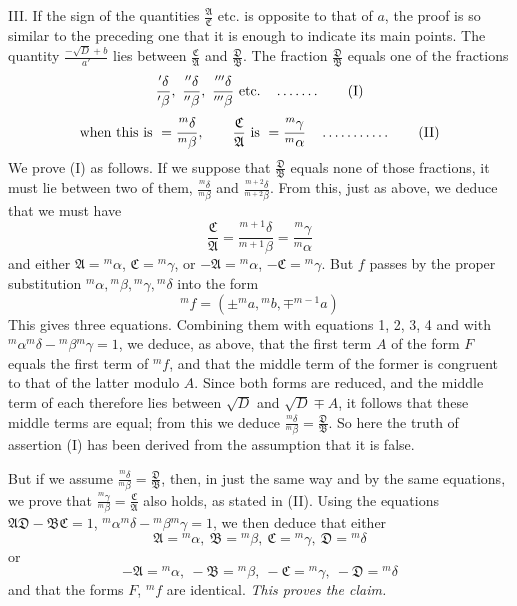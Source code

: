 III. If the sign of the quantities $\frac{\mathfrak{A}}{\mathfrak{C}}$ etc. is opposite to that of $a$, the proof is so similar to the preceding one that it is enough to indicate its main points. The quantity $\frac{-\surd D+b}{a'}$ lies between $\frac{\mathfrak{C}}{\mathfrak{A}}$ and $\frac{\mathfrak{D}}{\mathfrak{B}}$. The fraction $\frac{\mathfrak{D}}{\mathfrak{B}}$ equals one of the fractions
\begin{equation*}
\frac{{}'\delta}{{}'\beta},\ \frac{{}''\delta}{{}''\beta},\ \frac{{}'''\delta}{{}'''\beta}\text{ etc.}
\quad \mathinner{\ldotp\ldotp\ldotp\ldotp\ldotp\ldotp\ldotp} \tag*{(I)}
\end{equation*}
\begin{equation*}
\text{when this is }=\frac{{}^m\delta}{{}^m\beta},\qquad \frac{\mathfrak{C}}{\mathfrak{A}}\text{ is }=\frac{{}^m\gamma}{{}^m\alpha}
\quad \mathinner{\ldotp\ldotp\ldotp\ldotp\ldotp\ldotp\ldotp\ldotp\ldotp\ldotp\ldotp} \tag*{(II)}
\end{equation*}
We prove (I) as follows. If we suppose that $\frac{\mathfrak{D}}{\mathfrak{B}}$ equals none of those fractions, it must lie between two of them, $\frac{{}^m\delta}{{}^m\beta}$ and $\frac{{}^{m+2}\delta}{{}^{m+2}\beta}$. From this, just as above, we deduce that we must have
\[
\frac{\mathfrak{C}}{\mathfrak{A}}=\frac{{}^{m+1}\delta}{{}^{m+1}\beta}=\frac{{}^m\gamma}{{}^m\alpha}
\]
and either $\mathfrak{A}={}^m\alpha$, $\mathfrak{C}={}^m\gamma$, or $-\mathfrak{A}={}^m\alpha$, $-\mathfrak{C}={}^m\gamma$. But $f$ passes by the proper substitution ${}^m\alpha,{}^m\beta,{}^m\gamma,{}^m\delta$ into the form
\[
{}^m f=(\pm{}^m a,{}^m b,\mp{}^{m-1}a)
\]
This gives three equations. Combining them with equations 1, 2, 3, 4 and with ${}^m\alpha{}^m\delta-{}^m\beta{}^m\gamma=1$, we deduce, as above, that the first term $A$ of the form $F$ equals the first term of ${}^m f$, and that the middle term of the former is congruent to that of the latter modulo $A$. Since both forms are reduced, and the middle term of each therefore lies between $\surd D$ and $\surd D\mp A$, it follows that these middle terms are equal; from this we deduce $\frac{{}^m\delta}{{}^m\beta}=\frac{\mathfrak{D}}{\mathfrak{B}}$. So here the truth of assertion (I) has been derived from the assumption that it is false.

But if we assume $\frac{{}^m\delta}{{}^m\beta}=\frac{\mathfrak{D}}{\mathfrak{B}}$, then, in just the same way and by the same equations,
we prove that ${\frac{{}^m\gamma}{{}^m\beta}}=\frac{\mathfrak{C}}{\mathfrak{A}}$ also holds, as stated in (II). Using the equations $\mathfrak{A}\mathfrak{D}-\mathfrak{B}\mathfrak{C}=1$, ${}^m\alpha{}^m\delta-{}^m\beta{}^m\gamma=1$, we then deduce that either
\[
\mathfrak{A}={}^m\alpha,\ \mathfrak{B}={}^m\beta,\ \mathfrak{C}={}^m\gamma,\ \mathfrak{D}={}^m\delta
\]
or
\[
-\mathfrak{A}={}^m\alpha,\ -\mathfrak{B}={}^m\beta,\ -\mathfrak{C}={}^m\gamma,\ -\mathfrak{D}={}^m\delta
\]
and that the forms $F$, ${}^m f$ are identical. \textit{This proves the claim.}
